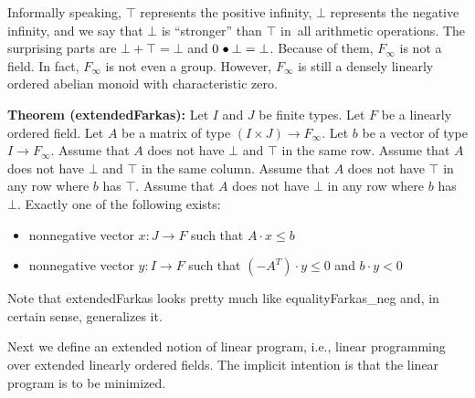 \documentclass[]{article}
\renewcommand{\.}{\hskip .75pt}
\let\r=\rightarrow
\let\*=\cdot
\begin{document}
Informally speaking, $\top$ represents the positive infinity,
$\bot$ represents the negative infinity, and we say that
$\bot$ is ``stronger'' than $\top$ in~all arithmetic operations.
The surprising parts are $\bot + \top = \bot$ and $0 \.\bullet \bot = \bot$.
Because of them, $F_\infty$ is not a field.
In fact, $F_\infty$ is not even a group. 
However, $F_\infty$ is still a densely linearly ordered abelian monoid
with characteristic zero.

\medskip \noindent
\textbf{Theorem (extendedFarkas):}
Let $I$ and $J$ be finite types.
Let $F$ be a linearly ordered field.
Let $A$ be a matrix of type $(I \times J) \r F_\infty$.
Let $b$ be a vector of type $I \r F_\infty$.
Assume that $A$ does not have $\bot$ and $\top$ in the same row.
Assume that $A$ does not have $\bot$ and $\top$ in the same column.
Assume that $A$ does not have $\top$ in any row where $b$ has $\top$.
Assume that $A$ does not have $\bot$ in any row where $b$ has~$\bot$.
Exactly one of the following exists:
\begin{itemize}
\item nonnegative vector $x : J \r F$ such that $A \* x \le b$
\item nonnegative vector $y : I \r F$ such that $(-A^T) \* y \le 0$ and $b \* y < 0$
\end{itemize}
Note that extendedFarkas looks pretty much like equalityFarkas\_neg and,
in certain sense, generalizes it.

Next we define an extended notion of linear program, i.e.,
linear programming over extended linearly ordered fields.
The implicit intention is that the linear program is to be minimized.
\end{document}
